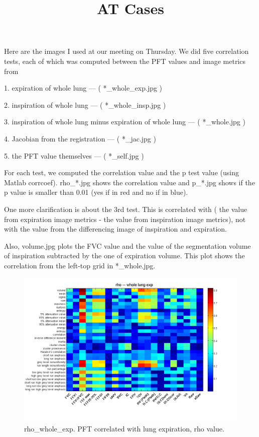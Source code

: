 \documentclass[12pt]{article}
\title{AT Cases}
\date{}
\begin{document}
\maketitle


Here are the images I used at our meeting on Thursday. We did five
correlation tests, each of which was computed between the PFT values and
image metrics from

1. expiration of whole lung  --- ( *\_whole\_exp.jpg )

2. inspiration of whole lung --- ( *\_whole\_insp.jpg )

3. inspiration of whole lung minus expiration of whole lung --- (
*\_whole.jpg )

4. Jacobian from the registration --- ( *\_jac.jpg )

5. the PFT value themselves --- ( *\_self.jpg )

For each test, we computed the correlation value and the p test value
(using Matlab corrcoef). rho\_*.jpg shows the correlation value and
p\_*.jpg shows if the p value is smaller than 0.01 (yes if in red and no
if in blue).

One more clarification is about the 3rd test. This is correlated with (
the value from expiration image metrics - the value from inspiration
image metrics), not with the value from the differencing image of
inspiration and expiration.

Also, volume.jpg plots the FVC value and the value of  the segmentation
volume of inspiration subtracted by the one of expiration volume. This
plot shows the correlation from the left-top grid in *\_whole.jpg.


\begin{figure}
\includegraphics[width=0.9\linewidth,viewport=100 60 620 520]{rho_whole_exp.png}
 \caption{rho\_whole\_exp. PFT correlated with lung expiration, rho value.}
\end{figure}
\end{document}
